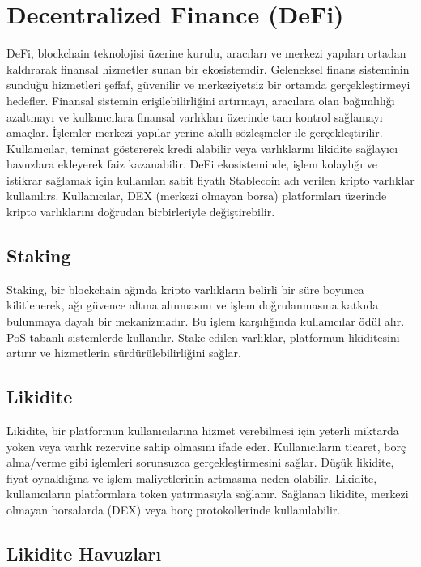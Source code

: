 \section{Decentralized Finance (DeFi)}

DeFi, blockchain teknolojisi üzerine kurulu, aracıları ve merkezi yapıları ortadan kaldırarak finansal hizmetler sunan bir ekosistemdir. Geleneksel finans sisteminin sunduğu hizmetleri şeffaf, güvenilir ve merkeziyetsiz bir ortamda gerçekleştirmeyi hedefler. Finansal sistemin erişilebilirliğini artırmayı, aracılara olan bağımlılığı azaltmayı ve kullanıcılara finansal varlıkları üzerinde tam kontrol sağlamayı amaçlar. İşlemler merkezi yapılar yerine akıllı sözleşmeler ile gerçekleştirilir. Kullanıcılar, teminat göstererek kredi alabilir veya varlıklarını likidite sağlayıcı havuzlara ekleyerek faiz kazanabilir. DeFi ekosisteminde, işlem kolaylığı ve istikrar sağlamak için kullanılan sabit fiyatlı Stablecoin adı verilen kripto varlıklar kullanılırs. Kullanıcılar, DEX (merkezi olmayan borsa) platformları üzerinde kripto varlıklarını doğrudan birbirleriyle değiştirebilir.

\subsection{Staking}

Staking, bir blockchain ağında kripto varlıkların belirli bir süre boyunca kilitlenerek, ağı güvence altına alınmasını ve işlem doğrulanmasına katkıda bulunmaya dayalı bir mekanizmadır. Bu işlem karşılığında kullanıcılar ödül alır. PoS tabanlı sistemlerde kullanılır. Stake edilen varlıklar, platformun likiditesini artırır ve hizmetlerin sürdürülebilirliğini sağlar.

\subsection{Likidite}

Likidite, bir platformun kullanıcılarına hizmet verebilmesi için yeterli miktarda yoken veya varlık rezervine sahip olmasını ifade eder. Kullanıcıların ticaret, borç alma/verme gibi işlemleri sorunsuzca gerçekleştirmesini sağlar. Düşük likidite, fiyat oynaklığına ve işlem maliyetlerinin artmasına neden olabilir. Likidite,  kullanıcıların platformlara token yatırmasıyla sağlanır. Sağlanan likidite, merkezi olmayan borsalarda (DEX) veya borç protokollerinde kullanılabilir.

\subsection{Likidite Havuzları}

